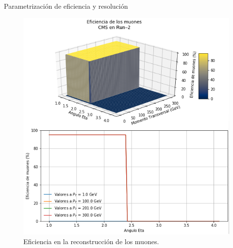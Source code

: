 \begin{frame}{Parametrización de eficiencia y resolución}
\begin{figure}[ht]
\begin{minipage}[b]{0.45\linewidth}
            \includegraphics[width=\textwidth]{Imag/Eficiencia_of_Muon_CMS.png}
            \caption{Eficiencia en la reconstrucción de los muones.}
            \label{fig:b}
        \end{minipage}
    \end{figure}
    
\end{frame}